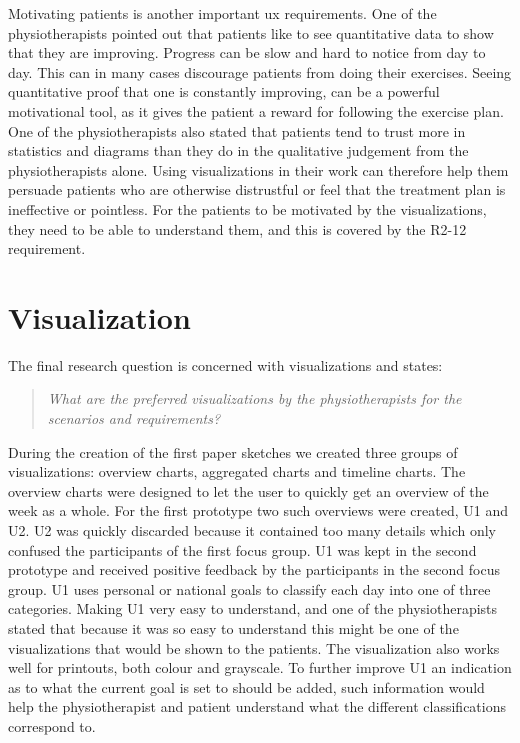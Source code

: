 Motivating patients is another important \gls{ux} requirements. One of the physiotherapists pointed out that patients like to see quantitative data to show that they are improving. Progress can be slow and hard to notice from day to day. This can in many cases discourage patients from doing their exercises. Seeing quantitative proof that one is constantly improving, can be a powerful motivational tool, as it gives the patient a reward for following the exercise plan. One of the physiotherapists also stated that patients tend to trust more in statistics and diagrams than they do in the qualitative judgement from the physiotherapists alone. Using visualizations in their work can therefore help them persuade patients who are otherwise distrustful or feel that the treatment plan is ineffective or pointless. For the patients to be motivated by the visualizations, they need to be able to understand them, and this is covered by the R2-12 requirement. 

\section{Visualization}
The final research question is concerned with visualizations and states:
\begin{quote}
  \textit{What are the preferred visualizations by the physiotherapists for the scenarios and requirements?}
\end{quote}

During the creation of the first paper sketches we created three groups of visualizations: overview charts, aggregated charts and timeline charts. The overview charts were designed to let the user to quickly get an overview of the week as a whole. For the first prototype two such overviews were created, U1 and U2. U2 was quickly discarded because it contained too many details which only confused the participants of the first focus group. U1 was kept in the second prototype and received positive feedback by the participants in the second focus group. U1 uses personal or national goals to classify each day into one of three categories. Making U1 very easy to understand, and one of the physiotherapists stated that because it was so easy to understand this might be one of the visualizations that would be shown to the patients. The visualization also works well for printouts, both colour and grayscale. To further improve U1 an indication as to what the current goal is set to should be added, such information would help the physiotherapist and patient understand what the different classifications correspond to.

